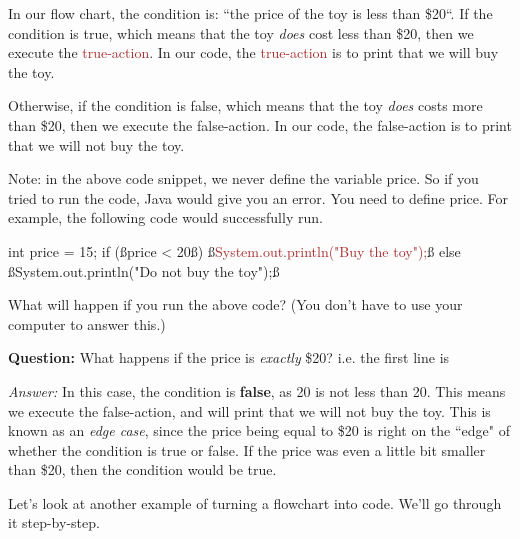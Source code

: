 In our flow chart, the \textcolor{mygreen}{condition} is: ``the price of the toy is less than \$20``. If the \textcolor{mygreen}{condition} is true, which means that the toy \emph{does} cost less than \$20, then we execute the \textcolor{Brown}{true-action}. In our code, the \textcolor{Brown}{true-action} is to print that we will buy the toy.

Otherwise, if the \textcolor{mygreen}{condition} is false, which means that the toy \emph{does} costs more than \$20, then we execute the \textcolor{Rhodamine}{false-action}. In our code, the \textcolor{Rhodamine}{false-action} is to print that we will not buy the toy.

Note: in the above code snippet, we never define the variable \textcolor{mygreen}{price}. So if you tried to run the code, Java would give you an error. You need to define \textcolor{mygreen}{price}. For example, the following code would successfully run.

\begin{code}
int price = 15;
if (ß\textcolor{mygreen}{price < 20}ß) 
{
    ß\textcolor{Brown}{System.out.println("Buy the toy");}ß
}
else
{
    ß\textcolor{Rhodamine}{System.out.println("Do not buy the toy");}ß
}
\end{code}

\begin{exercise}
What will happen if you run the above code? (You don't have to use your computer to answer this.)
\end{exercise}

\noindent \textbf{Question: } What happens if the price is \emph{exactly} \$20? i.e. the first line is 

\noindent \textit{Answer: } In this case, the \textcolor{mygreen}{condition} is \textbf{false}, as 20 is not less than 20. This means we execute the \textcolor{Rhodamine}{false-action}, and will print that we will not buy the toy.
This is known as an \emph{edge case}, since the price being equal to \$20 is right on the ``edge" of whether the \textcolor{mygreen}{condition} is true or false. If the price was even a little bit smaller than \$20, then the \textcolor{mygreen}{condition} would be true.

Let's look at another example of turning a flowchart into code. We'll go through it step-by-step.

